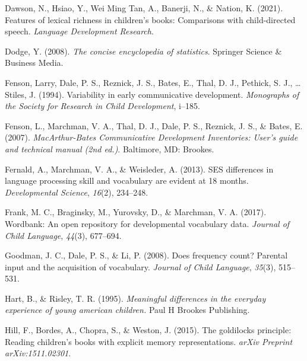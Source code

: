 \documentclass[10pt, letterpaper]{article}
\newenvironment{CSLReferences}%
  {}%
  {\par}
\begin{document}
\begin{CSLReferences}{1}{0}
\leavevmode{}%
Dawson, N., Hsiao, Y., Wei Ming Tan, A., Banerji, N., \& Nation, K.
(2021). Features of lexical richness in children's books: Comparisons
with child-directed speech. \emph{Language Development Research}.

\leavevmode{}%
Dodge, Y. (2008). \emph{The concise encyclopedia of statistics}.
Springer Science \& Business Media.

\leavevmode{}%
Fenson, Larry, Dale, P. S., Reznick, J. S., Bates, E., Thal, D. J.,
Pethick, S. J., \ldots{} Stiles, J. (1994). Variability in early
communicative development. \emph{Monographs of the Society for Research
in Child Development}, i--185.

\leavevmode{}%
Fenson, L., Marchman, V. A., Thal, D. J., Dale, P. S., Reznick, J. S.,
\& Bates, E. (2007). \emph{{M}ac{A}rthur-{B}ates {C}ommunicative
{D}evelopment {I}nventories: User's guide and technical manual (2nd
ed.)}. Baltimore, MD: Brookes.

\leavevmode{}%
Fernald, A., Marchman, V. A., \& Weisleder, A. (2013). SES differences
in language processing skill and vocabulary are evident at 18 months.
\emph{Developmental Science}, \emph{16}(2), 234--248.

\leavevmode{}%
Frank, M. C., Braginsky, M., Yurovsky, D., \& Marchman, V. A. (2017).
Wordbank: An open repository for developmental vocabulary data.
\emph{Journal of Child Language}, \emph{44}(3), 677--694.

\leavevmode{}%
Goodman, J. C., Dale, P. S., \& Li, P. (2008). Does frequency count?
Parental input and the acquisition of vocabulary. \emph{Journal of Child
Language}, \emph{35}(3), 515--531.

\leavevmode{}%
Hart, B., \& Risley, T. R. (1995). \emph{Meaningful differences in the
everyday experience of young american children.} Paul H Brookes
Publishing.

\leavevmode{}%
Hill, F., Bordes, A., Chopra, S., \& Weston, J. (2015). The goldilocks
principle: Reading children's books with explicit memory
representations. \emph{arXiv Preprint arXiv:1511.02301}.


\end{CSLReferences}
\end{document}
